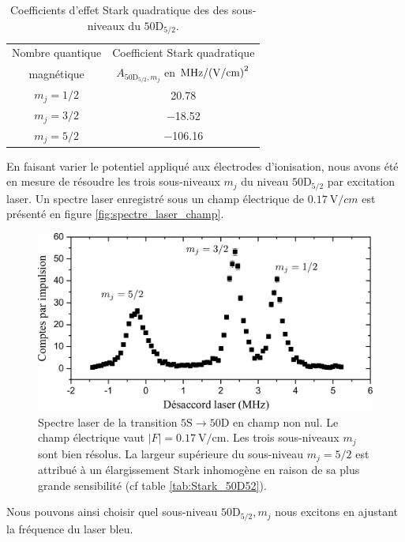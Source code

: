 \begin{table}[!h]
	\centering
	\caption[Effet Stark quadratique des sous-niveaux du $\mathrm{50D}_{5/2}$]{Coefficients d'effet Stark quadratique des des sous-niveaux du $\mathrm{50D}_{5/2}$.
	}
	\label{tab:Stark_50D52}
	\begin{tabular}{c c }
		\toprule\midrule
		Nombre quantique
		& Coefficient Stark quadratique
		\\
		magnétique
		& $A_{\mathrm{50D}_{5/2},m_j}$ en $\si{\MHz \per (\V \per\cm) \squared}$ \\
		\midrule
		$m_j=1/2$
		& \SI[retain-explicit-plus]{+20.78}{} \\
		$m_j=3/2$
		& \SI{-18.52}{} \\
		$m_j=5/2$
		& \SI{-106.16}{} \\
		\midrule
		\bottomrule
 	\end{tabular}
\end{table}

En faisant varier le potentiel appliqué aux électrodes d'ionisation, nous avons été en mesure de résoudre les trois sous-niveaux $m_j$ du niveau $\mathrm{50D}_{5/2}$ par excitation laser.
Un spectre laser enregistré sous un champ électrique de $\SI{0.17}{\V/cm}$ est présenté en figure \eqref{fig:spectre_laser_champ}.
%
\begin{figure}[!h]
\centering
\includegraphics[width=0.85\linewidth]{figures/circulars/spectre_laser_champ}
\caption[Spectre laser de la transition $\mathrm{5S\rightarrow 50D}$ en champ non nul]{
Spectre laser de la transition $\mathrm{5S\rightarrow 50D}$ en champ non nul.
Le champ électrique vaut $|F| = \SI{0.17}{\V/\cm}$.
Les trois sous-niveaux $m_j$ sont bien résolus.
La largeur supérieure du sous-niveau $m_j=5/2$ est attribué à un élargissement Stark inhomogène en raison de sa plus grande sensibilité (cf table \eqref{tab:Stark_50D52}).
}
\label{fig:spectre_laser_champ}
\end{figure}
%
Nous pouvons ainsi choisir quel sous-niveau $\mathrm{50D}_{5/2},m_j$ nous excitons en ajustant la fréquence du laser bleu.

